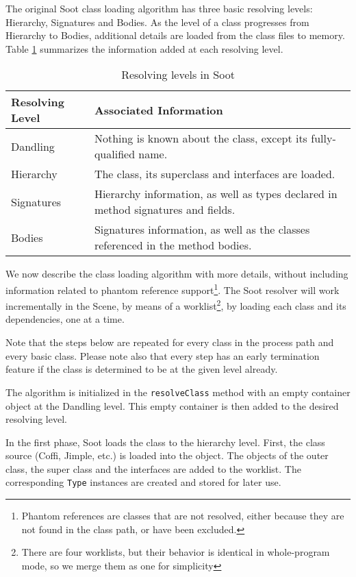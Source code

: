 \documentclass[preprint]{sigplanconf}
\begin{document}
The original Soot class loading algorithm has three basic resolving levels: Hierarchy, Signatures and Bodies. As the level of a class progresses from Hierarchy to Bodies, additional details are loaded from the class files to memory. Table \ref{tbl:resolving_levels} summarizes the information added at each resolving level. 

\begin{table}
\begin{tabularx}{\columnwidth}{|l|X|}
\hline
\textbf{Resolving Level} & \textbf{Associated Information} \\\hline
Dandling  & Nothing is known about the class, except its fully-qualified name.\\\hline
Hierarchy & The class, its superclass and interfaces are loaded. \\\hline
Signatures & Hierarchy information, as well as types declared in method signatures and fields. \\\hline
Bodies & Signatures information, as well as the classes referenced in the method bodies. \\\hline
\end{tabularx}
\caption{Resolving levels in Soot}
\label{tbl:resolving_levels}
\end{table}

We now describe the class loading algorithm with more details, without including information related to phantom reference support\footnote{Phantom references are classes that are not resolved, either because they are not found in the class path, or have been excluded.}.
The Soot resolver will work incrementally in the Scene, by means of a worklist\footnote{There are four worklists, but their behavior is identical in whole-program mode, so we merge them as one for simplicity}, by loading each class and its dependencies, one at a time.

Note that the steps below are repeated for every class in the process path and every basic class. Please note also that every step has an early termination feature if the class is determined to be at the given level already.

The algorithm is initialized in the {\tt resolveClass} method with an empty \sootclass container object at the Dandling level. This empty container is then added to the desired resolving level.

In the first phase, Soot loads the class to the hierarchy level. First, the class source (Coffi, Jimple, etc.) is loaded into the \sootclass object.
The \sootclass objects of the outer class, the super class and the interfaces are added to the worklist. The corresponding {\tt Type} instances are created and stored for later use.
\end{document}
